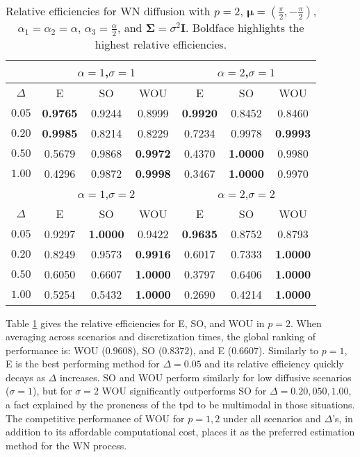 \documentclass[oneside,11pt]{article}
\newcommand{\bmu}{\boldsymbol\mu}
\newcommand{\bSigma}{\boldsymbol\Sigma}
\newcommand{\bI}{\mathbf{I}}
\newcommand{\lrp}[1]{\left(#1\right)}
\begin{document}
\begin{table}[H]
\centering
\small
\begin{tabular}{c|ccc||ccc}
\toprule\toprule
& \multicolumn{3}{c||}{$\alpha=1$,\quad $\sigma=1$} & \multicolumn{3}{c}{$\alpha=2$,\quad $\sigma=1$} \\ \midrule
$\Delta$ &      E      &     SO      &          WOU          &   E    &   SO   &              WOU              \\ \midrule
$0.05$ & \bf  0.9765 &  0.9244 &  0.8999 & \bf  0.9920 &  0.8452 &  0.8460\\
$0.20$ & \bf  0.9985 &  0.8214 &  0.8229 &  0.7234 &  0.9978 & \bf  0.9993\\
$0.50$ &  0.5679 &  0.9868 & \bf  0.9972 &  0.4370 & \bf  1.0000 &  0.9980\\
$1.00$ &  0.4296 &  0.9872 & \bf  0.9998 &  0.3467 & \bf  1.0000 &  0.9970\\ \midrule\midrule
& \multicolumn{3}{c||}{$\alpha=1$,\quad $\sigma=2$} & \multicolumn{3}{c}{$\alpha=2$,\quad $\sigma=2$} \\ \midrule
$\Delta$ &      E      &     SO      &          WOU          &   E    &   SO   &              WOU              \\ \midrule
$0.05$ &  0.9297 & \bf  1.0000 &  0.9422 & \bf  0.9635 &  0.8752 &  0.8793\\
$0.20$ &  0.8249 &  0.9573 & \bf  0.9916 &  0.6017 &  0.7333 & \bf  1.0000\\
$0.50$ &  0.6050 &  0.6607 & \bf  1.0000 &  0.3797 &  0.6406 & \bf  1.0000\\
$1.00$ &  0.5254 &  0.5432 & \bf  1.0000 &  0.2690 &  0.4214 & \bf  1.0000\\ \bottomrule\bottomrule
\end{tabular}
\caption{\small Relative efficiencies for WN diffusion with $p=2$, $\bmu=\lrp{\tfrac{\pi}{2},-\tfrac{\pi}{2}}$, $\alpha_1=\alpha_2=\alpha$, $\alpha_3=\tfrac{\alpha}{2}$, and $\bSigma=\sigma^2\bI$. Boldface highlights the highest relative efficiencies.\label{tab:wn2}}
\end{table}

\pagebreak

Table \ref{tab:wn2} gives the relative efficiencies for E, SO, and WOU in $p=2$. When averaging across scenarios and discretization times, the global ranking of performance is: WOU ($0.9608$), SO ($0.8372$), and E ($0.6607$). Similarly to $p=1$, E is the best performing method for $\Delta=0.05$ and its relative efficiency quickly decays as $\Delta$ increases. SO and WOU perform similarly for low diffusive scenarios ($\sigma=1$), but for $\sigma=2$ WOU significantly outperforms SO for $\Delta=0.20,050,1.00$, a fact explained by the proneness of the tpd to be multimodal in those situations. The competitive performance of WOU for $p=1,2$ under all scenarios and $\Delta$'s, in addition to its affordable computational cost, places it as the preferred estimation method for the WN process.
\end{document}
